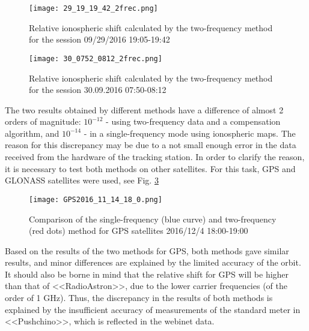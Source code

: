 \documentclass[a4paper,english,bopenany]{article}
\begin{document}
\begin{figure}[ht!] 
		\centering
		\texttt{[image: 29\_19\_19\_42\_2frec.png]}
		\caption{Relative ionospheric shift calculated by the two-frequency method for the session 09/29/2016 19:05-19:42} 
		\label{fig7.2}
		\vspace{4ex} 
		

\end{figure}
\begin{figure}[ht!] 
	

	\centering
	\texttt{[image: 30\_0752\_0812\_2frec.png]}
	\caption{Relative ionospheric shift calculated by the two-frequency method for the session 30.09.2016 07:50-08:12}
	\vspace{4ex}
	\label{fig7.3}


\end{figure}

The two results obtained by different methods have a difference of almost 2 orders of magnitude: $ 10^{- 12} $ - using two-frequency data and a compensation algorithm, and $ 10^{- 14} $ - in a single-frequency mode using ionospheric maps. The reason for this discrepancy may be due to a not small enough error in the data received from the hardware of the tracking station. In order to clarify the reason, it is necessary to test both methods on other satellites. For this task, GPS and GLONASS satellites were used, see Fig. \ref{fig:df_IonoGPS_124}


 \begin{figure}[!h]
	\centering
	\texttt{[image: GPS2016\_11\_14\_18\_0.png]}
	\caption{Comparison of the single-frequency (blue curve) and two-frequency (red dots) method for GPS satellites 2016/12/4 18:00-19:00}
	\label{fig:df_IonoGPS_124}
\end{figure}



Based on the results of the two methods for GPS, both methods gave similar results, and minor differences are explained by the limited accuracy of the orbit. It should also be borne in mind that the relative shift for GPS will be higher than that of <<RadioAstron>>, due to the lower carrier frequencies (of the order of 1 GHz). Thus, the discrepancy in the results of both methods is explained by the insufficient accuracy of measurements of the standard meter in <<Pushchino>>, which is reflected in the webinet data.
\end{document}
